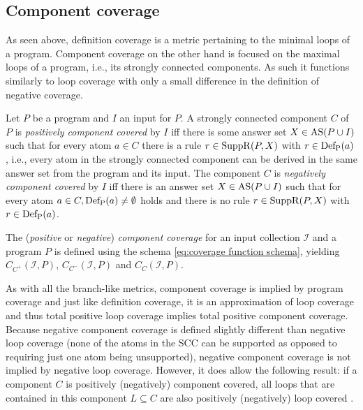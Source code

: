 \subsection{Component coverage}
\label{subsec:Coverage cetrics/Branch-like coverage/Component coverage}
As seen above, definition coverage is a metric pertaining to the minimal loops of a program. Component coverage on the other hand is focused on the maximal loops of a program, i.e., its strongly connected components. As such it functions similarly to loop coverage with only a small difference in the definition of negative coverage.

\begin{definition}
\label{def:component coverage}
    Let $P$ be a program and $I$ an input for $P$. A strongly connected component $C$ of $P$ is \emph{positively component covered} by $I$ iff there is some answer set \(X \in \operatorname{AS}(P \cup I)\) such that for every atom \(a \in C\) there is a rule \(r \in \operatorname{SuppR}(P, X)\) with \(r \in \operatorname{Def_P}(a)\), i.e., every atom in the strongly connected component can be derived in the same answer set from the program and its input.
    The component $C$ is \emph{negatively component covered} by $I$ iff there is an answer set \(X \in \operatorname{AS}(P \cup I)\) such that for every atom \(a \in C, \operatorname{Def_P}(a) \neq \emptyset\) holds and there is no rule \(r \in \operatorname{SuppR}(P, X)\) with \(r \in \operatorname{Def_P}(a)\).
\end{definition}

The (\emph{positive} or \emph{negative}) \emph{component coverage} for an input collection $\mathcal{I}$ and a program $P$ is defined using the schema \ref{eq:coverage function schema}, yielding \(C_{C^+}(\mathcal{I}, P)\), \(C_{C^-}(\mathcal{I}, P)\) and \(C_{C}(\mathcal{I}, P)\).

As with all the branch-like metrics, component coverage is implied by program coverage and just like definition coverage, it is an approximation of loop coverage and thus total positive loop coverage implies total positive component coverage.
Because negative component coverage is defined slightly different than negative loop coverage (none of the atoms in the SCC can be supported as opposed to requiring just one atom being unsupported), negative component coverage is not implied by negative loop coverage. However, it does allow the following result: if a component $C$ is positively (negatively) component covered, all loops that are contained in this component \(L \subseteq C\) are also positively (negatively) loop covered \cite[Theorem 7]{Jan+10}.

